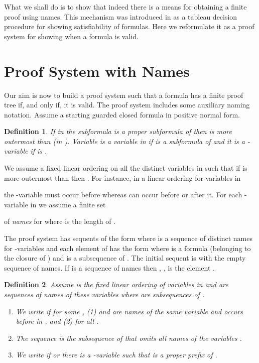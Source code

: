 \documentclass[copyright,creativecommons]{eptcs}
\newtheorem{defin}{Definition}
\def\w{\emph}
\begin{document}
What we shall do is to show that indeed there is a means for obtaining a 
finite proof using names. This mechanism was introduced in \cite{Ju09}
as a  tableau decision procedure for showing
satisfiability of  formulas. Here we reformulate it as a proof system
for showing when a formula is valid.

\section{Proof System with Names}
\label{secnames}
Our aim is now to build a proof system such that a formula  
has a finite proof tree
if, and only if, it is valid. The proof system  includes 
some auxiliary naming notation.
Assume a starting guarded closed formula  in positive
normal form. 

\begin{defin}
If in  the subformula  is
a proper subformula of  then  is \w{more outermost} 
than 
(in ).  Variable  is a 
\w{variable} in  if  
is a subformula of  and it is a \w{-variable} if 
is .
\end{defin} 

We assume a fixed linear ordering  
on all the distinct  variables in  such that if 
is more outermost than  then . 
For instance, in a linear ordering for variables in  
 
the  -variable  must occur before  whereas  can 
occur before or after it. 
For each -variable  in  we assume a finite set 

of \w{names} for  where  is the length of .

The proof system has sequents of the form  where
 is a sequence of distinct names for -variables and
each element of  has the form   
where  is a formula (belonging to the closure of )  
and  is a  subsequence of . The initial sequent is
 with the empty sequence of names.
If  is a sequence of names then ,
, is the element . 

\begin{defin}
Assume   is the fixed  linear ordering  of
variables  in   and  are sequences of names
of these variables where   are subsequences of .
\begin{enumerate}
\item We write  if for some , 
(1)  and  are names of the same variable
and  occurs before  in , and (2) 
for all .
\item  The sequence  is the subsequence of
 that omits all names of the variables .
\item We write   if  or there is a -variable
 such that  is a proper prefix of .
\end{enumerate}
\end{defin}
\end{document}
